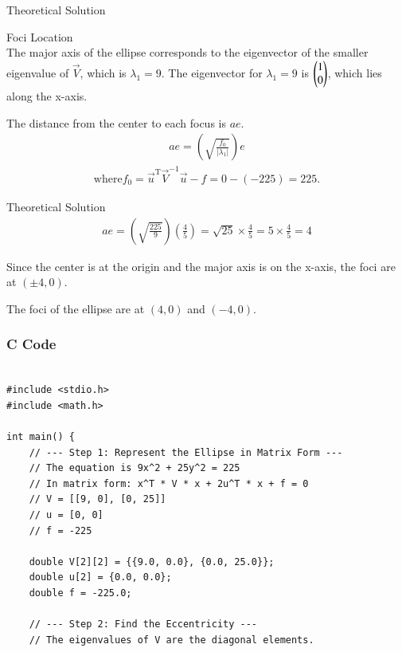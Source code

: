 \documentclass{beamer}
\begin{document}
\begin{frame}{Theoretical Solution}

Foci Location\\

The major axis of the ellipse corresponds to the eigenvector of the smaller eigenvalue of $\vec{V}$, which is $\lambda_1 = 9$. The eigenvector for $\lambda_1 = 9$ is $\begin{pmatrix} 1 \\ 0 \end{pmatrix}$, which lies along the x-axis.

The distance from the center to each focus is $ae$.\\


\begin{align}
    ae = \left( \sqrt{\frac{f_0}{|\lambda_1|}} \right) e
\end{align}
\begin{align}
    \text{where} f_0 = \vec{u}^{\text{T}}\vec{V}^{-1}\vec{u} - f = 0 - (-225) = 225.
\end{align}


\end{frame}
\begin{frame}{Theoretical Solution}
\begin{align}
    ae = \left( \sqrt{\frac{225}{9}} \right) \left( \frac{4}{5} \right) = \sqrt{25} \times \frac{4}{5} = 5 \times \frac{4}{5} = 4
\end{align}


Since the center is at the origin and the major axis is on the x-axis, the foci are at $(\pm 4, 0)$.



The foci of the ellipse are at $(4, 0)$ and $(-4, 0)$.

\end{frame}


\begin{frame}[fragile]
    \frametitle{C Code }
    \begin{lstlisting}

#include <stdio.h>
#include <math.h>

int main() {
    // --- Step 1: Represent the Ellipse in Matrix Form ---
    // The equation is 9x^2 + 25y^2 = 225
    // In matrix form: x^T * V * x + 2u^T * x + f = 0
    // V = [[9, 0], [0, 25]]
    // u = [0, 0]
    // f = -225

    double V[2][2] = {{9.0, 0.0}, {0.0, 25.0}};
    double u[2] = {0.0, 0.0};
    double f = -225.0;

    // --- Step 2: Find the Eccentricity ---
    // The eigenvalues of V are the diagonal elements.
   
        \end{lstlisting}
\end{frame}
\end{document}
